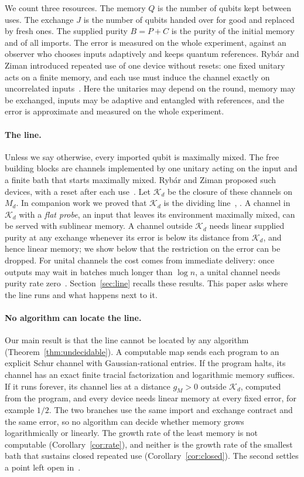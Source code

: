 \documentclass[11pt]{article}
\theoremstyle{definition}
\theoremstyle{remark}
\newcommand{\K}{\mathcal K}
\begin{document}
We count three resources. The memory $Q$ is the number of qubits kept between uses. The exchange $J$ is the number of qubits handed over for good and replaced by fresh ones. The supplied purity $B=P+C$ is the purity of the initial memory and of all imports. The error is measured on the whole experiment, against an observer who chooses inputs adaptively and keeps quantum references. Ryb\'ar and Ziman introduced repeated use of one device without resets: one fixed unitary acts on a finite memory, and each use must induce the channel exactly on uncorrelated inputs~\cite{RybarZiman}. Here the unitaries may depend on the round, memory may be exchanged, inputs may be adaptive and entangled with references, and the error is approximate and measured on the whole experiment.

\paragraph{The line.}
Unless we say otherwise, every imported qubit is maximally mixed. The free building blocks are channels implemented by one unitary acting on the input and a finite bath that starts maximally mixed. Ryb\'ar and Ziman proposed such devices, with a reset after each use~\cite[Section~IV]{RybarZiman}. Let $\K_d$ be the closure of these channels on $M_d$. In companion work we proved that $\K_d$ is the dividing line~\cite[Theorem~3.2(b)]{Memory}, \cite[Theorem~4.1]{Law}. A channel in $\K_d$ with a \emph{flat probe}, an input that leaves its environment maximally mixed, can be served with sublinear memory. A channel outside $\K_d$ needs linear supplied purity at any exchange whenever its error is below its distance from $\K_d$, and hence linear memory; we show below that the restriction on the error can be dropped. For unital channels the cost comes from immediate delivery: once outputs may wait in batches much longer than $\log n$, a unital channel needs purity rate zero~\cite[Theorem~3.5]{Law}. Section~\ref{sec:line} recalls these results. This paper asks where the line runs and what happens next to it.

\paragraph{No algorithm can locate the line.}
Our main result is that the line cannot be located by any algorithm (Theorem~\ref{thm:undecidable}). A computable map sends each program to an explicit Schur channel with Gaussian-rational entries. If the program halts, its channel has an exact finite tracial factorization and logarithmic memory suffices. If it runs forever, its channel lies at a distance $g_M>0$ outside $\K_d$, computed from the program, and every device needs linear memory at every fixed error, for example $1/2$. The two branches use the same import and exchange contract and the same error, so no algorithm can decide whether memory grows logarithmically or linearly. The growth rate of the least memory is not computable (Corollary~\ref{cor:rate}), and neither is the growth rate of the smallest bath that sustains closed repeated use (Corollary~\ref{cor:closed}). The second settles a point left open in~\cite{ClosedMemory}.
\end{document}
